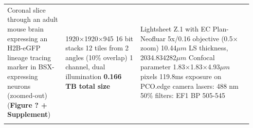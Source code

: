 \documentclass[]{spie}  %
\begin{document}
\begin{landscape}
{\begin{longtable}{lll}
\makecell[l]{Coronal slice through an adult \\mouse brain expressing an H2B-eGFP \\lineage tracing marker in BSX-expressing \\neurons  (zoomed-out) \\(\textbf{Figure ? + Supplement})} &  \makecell[l]{1920$\times$1920$\times$945 16 bit stacks\\12 tiles from 2 angles (10\% overlap) \\1 channel, dual illumination\\\textbf{0.166 TB total size}}  &  \makecell[l]{Lightsheet Z.1 with EC Plan-Neofluar 5x/0.16 objective (0.5$\times$ zoom)\\ 10.44$\mu{}m$ LS thickness, 2034.834282$\mu{}m$ Confocal parameter\\1.83$\times$1.83$\times$4.93$\mu{}m$ pixels\\119.8ms exposure on PCO.edge camera\\lasers: 488 nm 50\%\\filters: EF1 BP 505-545} \\ \\


\end{longtable}}
\end{landscape}
\end{document}
